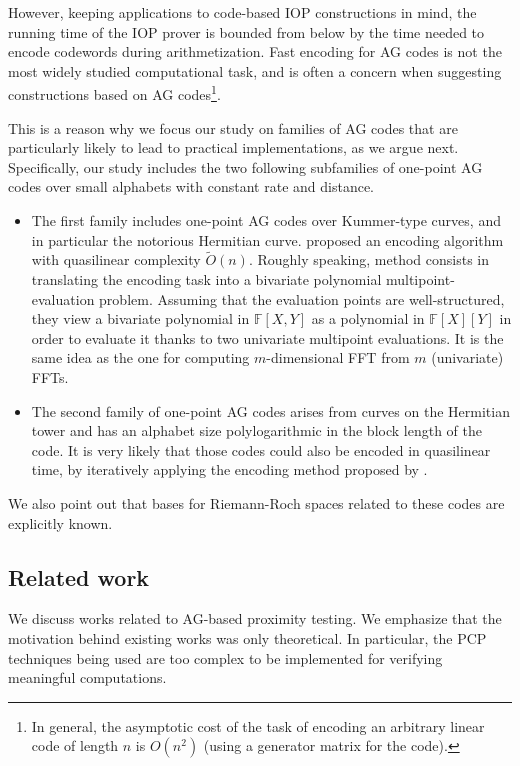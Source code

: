 \documentclass[10pt,a4paper]{article}
\newcommand\F{\mathbb{F}}
\theoremstyle{plain}
\theoremstyle{plain}
\theoremstyle{definition}
\theoremstyle{remark}
\theoremstyle{plain}
\begin{document}
However, keeping applications to code-based IOP constructions in mind, the running time of the IOP prover is bounded from below by the time needed to encode codewords during arithmetization. 
Fast encoding for AG codes is not the most widely studied computational task, and is often a concern when suggesting constructions based on AG codes\footnote{In general, the asymptotic cost of the task of encoding an arbitrary linear code of length $n$ is $O(n^2)$ (using a generator matrix for the code).}.

This is a reason why we focus our study on families of AG codes that are particularly likely to lead to practical implementations, as we argue next. Specifically, our study includes the two following subfamilies of one-point AG codes over small alphabets with constant rate and distance.

\begin{itemize}
	\item The first family includes one-point AG codes over Kummer-type curves, and in particular the notorious Hermitian curve. \cite{BRS20} proposed an encoding algorithm with quasilinear complexity $\widetilde{O}(n)$. Roughly speaking, \cite{BRS20} method consists in translating the encoding task into a bivariate polynomial multipoint-evaluation problem. Assuming that the evaluation points are well-structured, they view a bivariate polynomial in $\F[X, Y]$ as a polynomial in $\F[X][Y]$ in order to evaluate it thanks to two univariate multipoint evaluations. It is the same idea as the one for computing $m$-dimensional FFT from $m$ (univariate) FFTs.
	\item The second family of one-point AG codes arises from curves on the Hermitian tower and has an alphabet size polylogarithmic in the block length of the code. It is very likely that those codes could also be encoded in quasilinear time, by iteratively applying the encoding method proposed by \cite{BRS20}.
\end{itemize}

We also point out that bases for Riemann-Roch spaces related to these codes are explicitly known.

\subsection{Related work}
We discuss works related to AG-based proximity testing. We emphasize that the motivation behind existing works was only theoretical. In particular, the PCP techniques being used are too complex to be implemented for verifying meaningful computations.
\end{document}
